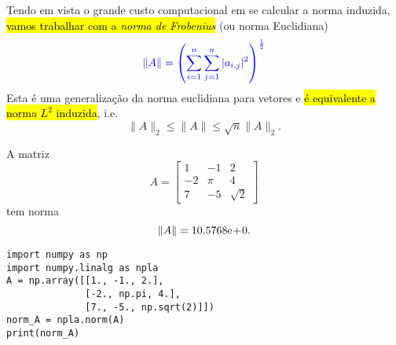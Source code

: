 Tendo em vista o grande custo computacional em se calcular a norma induzida, \hl{vamos trabalhar com a \emph{norma de Frobenius}} (ou norma Euclidiana{\euclides})
\begin{equation}\color{blue}\|A\| = \left(\sum_{i=1}^n\sum_{j=1}^n|a_{i,j}|^2\right)^{\frac{1}{2}}
\end{equation}
Esta é uma generalização da norma euclidiana para vetores e \hl{é equivalente a norma $L^2$ induzida}, i.e.
\begin{equation}
  \|A\|_2 \leq \|A\| \leq \sqrt{n}\|A\|_2.
\end{equation}

\begin{ex}\label{ex:norma_matriz}
  A matriz
  \begin{equation}
    A =
    \begin{bmatrix}
      1 & -1 & 2\\
      -2 & \pi & 4\\
      7 & -5 & \sqrt{2}
    \end{bmatrix}
  \end{equation}
  tem norma
  \begin{equation}
    \|A\| = 10.5768\mathrm{e}\!+\!0.
  \end{equation}

  \begin{lstlisting}
import numpy as np
import numpy.linalg as npla
A = np.array([[1., -1., 2.],
              [-2., np.pi, 4.],
              [7., -5., np.sqrt(2)]])
norm_A = npla.norm(A)
print(norm_A)
\end{lstlisting}

\end{ex}


